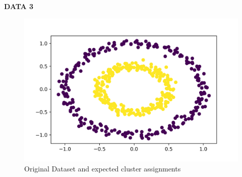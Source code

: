 \documentclass[11pt]{article}
\begin{document}
{\large \textbf{DATA 3}}%
\vspace*{-1cm}
\begin{figure}[H]
    \centering
    \includegraphics[width=0.55\linewidth]{d3.png}
    \caption{Original Dataset and expected cluster assignments}
\end{figure}%
\vspace*{-0.7cm}
\end{document}
